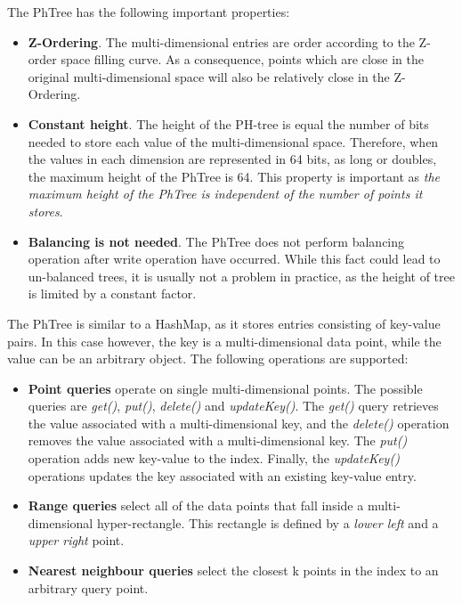 \documentclass[11pt,a4paper]{globis-book}
\begin{document}
The PhTree has the following important properties:
\begin{itemize}
    \item \textbf{Z-Ordering}. The multi-dimensional entries are order according to the Z-order space filling curve. As a consequence, points which are close in the original multi-dimensional space will also be relatively close in the Z-Ordering.
    \item \textbf{Constant height}. The height of the PH-tree is equal the number of bits needed to store each value of the multi-dimensional space. Therefore, when the values in each dimension are represented in 64 bits, as long or doubles, the maximum height of the PhTree is 64. This property is important as \textit{the maximum height of the PhTree is independent of the number of points it stores}.
    \item \textbf{Balancing is not needed}. The PhTree does not perform balancing operation after write operation have occurred. While this fact could lead to un-balanced trees, it is usually not a problem in practice, as the height of tree is limited by a constant factor.
\end{itemize}

The PhTree is similar to a HashMap, as it stores entries consisting of key-value pairs. In this case however, the key is a multi-dimensional data point, while the value can be an arbitrary object. The following operations are supported:
\begin{itemize}
    \item \textbf{Point queries} operate on single multi-dimensional points. The possible queries are \textit{get()}, \textit{put()}, \textit{delete()} and \textit{updateKey()}. The \textit{get()} query retrieves the value associated with a multi-dimensional key, and the \textit{delete()} operation removes the value associated with a multi-dimensional key. The \textit{put()} operation adds new key-value to the index. Finally, the \textit{updateKey()} operations updates the key associated with an existing key-value entry.
    \item \textbf{Range queries} select all of the data points that fall inside a multi-dimensional hyper-rectangle. This rectangle is defined by a \textit{lower left} and a \textit{upper right} point. 
    \item \textbf{Nearest neighbour queries} select the closest k points in the index to an arbitrary query point. 
\end{itemize}
\end{document}
